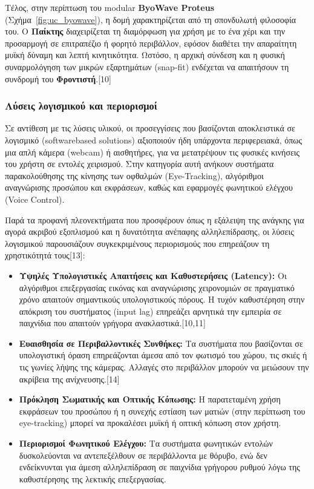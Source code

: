 \documentclass[twoside, a4paper, 11pt]{article}
\begin{document}
Τέλος, στην περίπτωση του modular \textbf{ByoWave Proteus} (Σχήμα~\ref{fig:uc_byowave}), η δομή χαρακτηρίζεται από τη σπονδυλωτή φιλοσοφία του. Ο \textbf{Παίκτης} διαχειρίζεται τη διαμόρφωση για χρήση με το ένα χέρι και την προσαρμογή σε επιτραπέζιο ή φορητό περιβάλλον, εφόσον διαθέτει την απαραίτητη μυϊκή δύναμη και λεπτή κινητικότητα. Ωστόσο, η αρχική σύνδεση και η φυσική συναρμολόγηση των μικρών εξαρτημάτων (snap-fit) ενδέχεται να απαιτήσουν τη συνδρομή του \textbf{Φροντιστή}.[10]

\raggedbottom
\subsubsection{Λύσεις λογισμικού και περιορισμοί}
Σε αντίθεση με τις λύσεις υλικού, οι προσεγγίσεις που βασίζονται αποκλειστικά σε λογισμικό (softwarebased solutions) αξιοποιούν ήδη υπάρχοντα περιφερειακά, όπως μια απλή κάμερα (webcam) ή αισθητήρες, για να μετατρέψουν τις φυσικές κινήσεις του χρήστη σε εντολές χειρισμού. Στην κατηγορία αυτή
ανήκουν συστήματα παρακολούθησης της κίνησης των οφθαλμών (Eye-Tracking), αλγόριθμοι αναγνώρισης προσώπου και εκφράσεων, καθώς και εφαρμογές φωνητικού ελέγχου (Voice Control).

Παρά τα προφανή πλεονεκτήματα που προσφέρουν όπως η εξάλειψη της ανάγκης για αγορά ακριβού εξοπλισμού και η δυνατότητα ανέπαφης αλληλεπίδρασης, οι λύσεις λογισμικού παρουσιάζουν συγκεκριμένους περιορισμούς που επηρεάζουν τη χρηστικότητά τους[13]:
\begin{itemize}
    \item \textbf{Υψηλές Υπολογιστικές Απαιτήσεις και Καθυστερήσεις (Latency):} Οι αλγόριθμοι επεξεργασίας εικόνας και αναγνώρισης χειρονομιών σε πραγματικό χρόνο απαιτούν σημαντικούς υπολογιστικούς πόρους. Η τυχόν καθυστέρηση στην απόκριση του συστήματος (input lag) επηρεάζει αρνητικά την εμπειρία σε παιχνίδια που απαιτούν γρήγορα ανακλαστικά.[10,11]
    \item \textbf{Ευαισθησία σε Περιβαλλοντικές Συνθήκες:} Τα συστήματα που βασίζονται σε υπολογιστική όραση επηρεάζονται άμεσα από τον φωτισμό του χώρου, τις σκιές ή τις γωνίες λήψης της κάμερας. Αλλαγές στο περιβάλλον μπορούν να μειώσουν την ακρίβεια της ανίχνευσης.[14]
    \item \textbf{Πρόκληση Σωματικής και Οπτικής Κόπωσης:} Η παρατεταμένη χρήση εκφράσεων του προσώπου ή η συνεχής εστίαση των ματιών (στην περίπτωση του eye-tracking) μπορεί να προκαλέσει μυϊκή ή οπτική κόπωση στον χρήστη.
    \item \textbf{Περιορισμοί Φωνητικού Ελέγχου:} Τα συστήματα φωνητικών εντολών δυσκολεύονται να αντεπεξέλθουν σε περιβάλλοντα με θόρυβο, ενώ δεν ενδείκνυνται για άμεση αλληλεπίδραση σε παιχνίδια γρήγορου ρυθμού λόγω της καθυστέρησης της λεκτικής επεξεργασίας.
\end{itemize}
\end{document}
